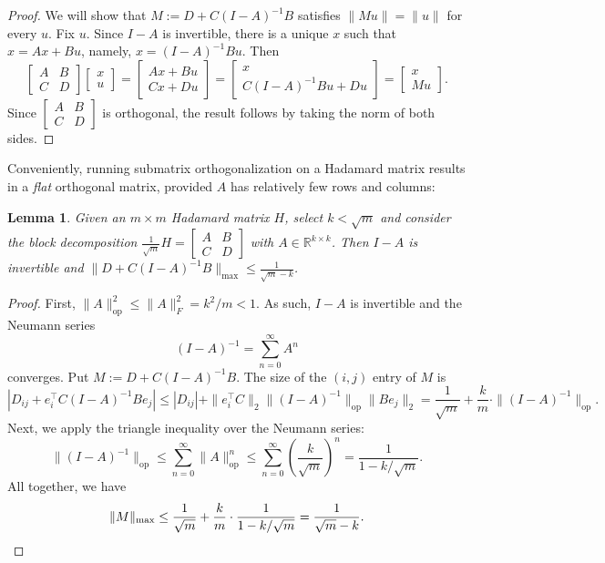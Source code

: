 \documentclass[11pt]{article}
\theoremstyle{plain}
\newtheorem{lemma}[theorem]{Lemma}
\theoremstyle{definition}
\begin{document}
\begin{proof}
We will show that $M:=D+C(I-A)^{-1}B$ satisfies $\|Mu\|=\|u\|$ for every $u$.
Fix $u$.
Since $I-A$ is invertible, there is a unique $x$ such that $x = Ax + Bu$, namely, $x = (I-A)^{-1}Bu$.
Then
\[
\left[\begin{array}{cc} A & B \\ C & D \end{array}\right]\left[\begin{array}{c} x \\ u \end{array}\right]
=\left[\begin{array}{c} Ax+Bu \\ Cx+Du \end{array}\right]
=\left[\begin{array}{c} x \\ C(I-A)^{-1}Bu+Du \end{array}\right]
=\left[\begin{array}{c} x \\ Mu \end{array}\right].
\]
Since $\left[\begin{smallmatrix} A & B \\ C & D \end{smallmatrix}\right]$ is orthogonal, the result follows by taking the norm of both sides.
\end{proof}

Conveniently, running submatrix orthogonalization on a Hadamard matrix results in a \textit{flat} orthogonal matrix, provided $A$ has relatively few rows and columns:

\begin{lemma}
\label{lem.submatrix is flat orthogonal}
Given an $m\times m$ Hadamard matrix $H$, select $k<\sqrt{m}$ and consider the block decomposition $\frac{1}{\sqrt{m}}H = \left[\begin{smallmatrix} A & B \\ C & D \end{smallmatrix}\right]$ with $A\in\mathbb{R}^{k\times k}$.
Then $I-A$ is invertible and $\|D+C(I-A)^{-1}B\|_{\max}\leq\frac{1}{\sqrt{m}-k}$.
\end{lemma}

\begin{proof}
First, $\|A\|_{\operatorname{op}}^2\leq\|A\|_F^2=k^2/m<1$.
As such, $I-A$ is invertible and the Neumann series
\[
(I-A)^{-1} 
= \sum_{n=0}^\infty A^n
\]
converges.
Put $M:=D+C(I-A)^{-1}B$.
The size of the $(i,j)$ entry of $M$ is
\[
| D_{ij}+e_i^\top C(I-A)^{-1}Be_j |
\leq | D_{ij} | + \|e_i^\top C\|_2 \|(I-A)^{-1}\|_{\operatorname{op}} \|Be_j\|_2
=\frac{1}{\sqrt{m}}+\frac{k}{m}\cdot\|(I-A)^{-1}\|_{\operatorname{op}}.
\]
Next, we apply the triangle inequality over the Neumann series:
\[
\|(I-A)^{-1}\|_{\operatorname{op}}
\leq\sum_{n=0}^\infty \|A\|_{\operatorname{op}}^n
\leq\sum_{n=0}^\infty \left(\frac{k}{\sqrt{m}}\right)^n
=\frac{1}{1-k/\sqrt{m}}.
\]
All together, we have
\[
\|M\|_{\max}
\leq\frac{1}{\sqrt{m}}+\frac{k}{m}\cdot\frac{1}{1-k/\sqrt{m}}
=\frac{1}{\sqrt{m}-k}.
\qedhere
\]
\end{proof}
\end{document}
